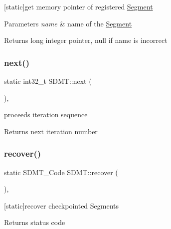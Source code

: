 \mbox{[}static\mbox{]}get memory pointer of registered \hyperlink{struct_s_d_m_t_1_1_segment}{Segment} 


\begin{DoxyParams}{Parameters}
{\em name} & name of the \hyperlink{struct_s_d_m_t_1_1_segment}{Segment} \\
\hline
\end{DoxyParams}
\begin{DoxyReturn}{Returns}
long integer pointer, null if name is incorrect 
\end{DoxyReturn}
\mbox{\label{class_s_d_m_t_a37514bde7d0c4d57bcb17e67f3877ce9}} 
\subsubsection{\texorpdfstring{next()}{next()}}
{\footnotesize\ttfamily static int32\+\_\+t S\+D\+M\+T\+::next (\begin{DoxyParamCaption}{ }\end{DoxyParamCaption})\hspace{0.3cm}{\ttfamily [inline]}, {\ttfamily [static]}}

proceeds iteration sequence \begin{DoxyReturn}{Returns}
next iteration number 
\end{DoxyReturn}
\mbox{\label{class_s_d_m_t_a3a3723f019f53a371c2c3b49efbed0f5}} 
\subsubsection{\texorpdfstring{recover()}{recover()}}
{\footnotesize\ttfamily static S\+D\+M\+T\+\_\+\+Code S\+D\+M\+T\+::recover (\begin{DoxyParamCaption}{ }\end{DoxyParamCaption})\hspace{0.3cm}{\ttfamily [inline]}, {\ttfamily [static]}}



\mbox{[}static\mbox{]}recover checkpointed Segments 

\begin{DoxyReturn}{Returns}
status code 
\end{DoxyReturn}
\mbox{\label{class_s_d_m_t_a4da48bca02cad8bfe78a1bafec4a1b1f}} 
